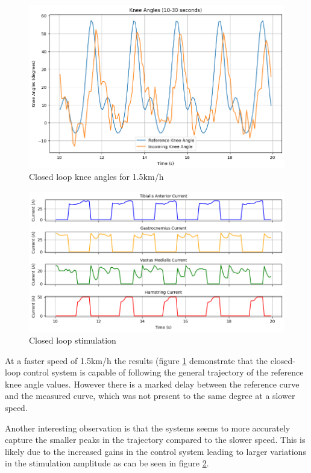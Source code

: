 \begin{figure} [H]
    \centering
    \includegraphics[width=0.9\linewidth]{images/CL12ref.png}
    \caption{Closed loop knee angles for 1.5km/h}
    \label{fig:cl12ref}
\end{figure}

\begin{figure} [H]
    \centering
    \includegraphics[width=0.9\linewidth]{images/CL12stim.png}
    \caption{Closed loop stimulation}
    \label{fig:cl12stim}
\end{figure}


At a faster speed of 1.5km/h the results (figure \ref{fig:cl12ref} demonstrate that the closed-loop control system is capable of following the general trajectory of the reference knee angle values. However there is a marked delay between the reference curve and the measured curve, which was not present to the same degree at a slower speed.

Another interesting observation is that the systems seems to more accurately capture the smaller peaks in the trajectory compared to the slower speed. This is likely due to the increased gains in the control system leading to larger variations in the stimulation amplitude as can be seen in figure \ref{fig:cl12stim}.

